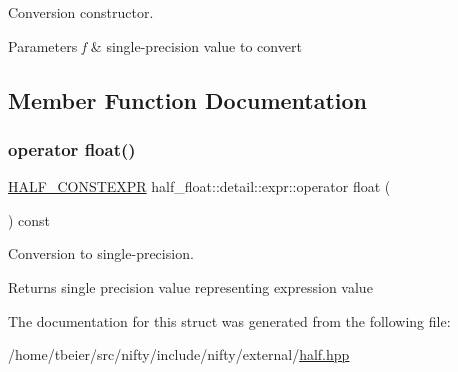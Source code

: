 Conversion constructor. 
\begin{DoxyParams}{Parameters}
{\em f} & single-\/precision value to convert \\
\hline
\end{DoxyParams}


\subsection{Member Function Documentation}
\mbox{\label{structhalf__float_1_1detail_1_1expr_acf4d1ca1eb867d11b0529e73b2e8e9dd}} 
\subsubsection{\texorpdfstring{operator float()}{operator float()}}
{\footnotesize\ttfamily \hyperlink{half_8hpp_ace3116a3e2cd66dd15780b92060987c7}{H\+A\+L\+F\+\_\+\+C\+O\+N\+S\+T\+E\+X\+PR} half\+\_\+float\+::detail\+::expr\+::operator float (\begin{DoxyParamCaption}{ }\end{DoxyParamCaption}) const\hspace{0.3cm}{\ttfamily [inline]}}

Conversion to single-\/precision. \begin{DoxyReturn}{Returns}
single precision value representing expression value 
\end{DoxyReturn}


The documentation for this struct was generated from the following file\+:\begin{DoxyCompactItemize}
\item 
/home/tbeier/src/nifty/include/nifty/external/\hyperlink{half_8hpp}{half.\+hpp}\end{DoxyCompactItemize}
